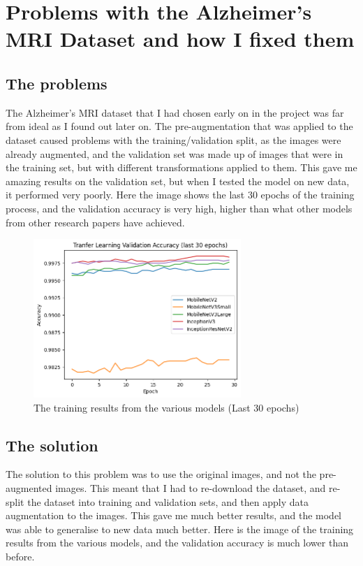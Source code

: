 \documentclass[]{final_report}
\begin{document}
\section{Problems with the Alzheimer's MRI Dataset and how I fixed them}

\subsection{The problems}
The Alzheimer's MRI dataset that I had chosen early on in the project was far from ideal as I found out later on.
The pre-augmentation that was applied to the dataset caused problems with the training/validation split, as the 
images were already augmented, and the validation set was made up of images that were in the training set, but 
with different transformations applied to them. This gave me amazing results on the validation set, but when I 
tested the model on new data, it performed very poorly. Here the image shows the last 30 epochs of the training process,
and the validation accuracy is very high, higher than what other models from other research papers have achieved.

\begin{figure}[h]
  \centering
  \includegraphics[width=0.7\textwidth]{images/bad-training-result.png}
  \caption{The training results from the various models (Last 30 epochs)}
  \label{fig:training_results}
\end{figure}

\pagebreak

\subsection{The solution}
The solution to this problem was to use the original images, and not the pre-augmented images.
This meant that I had to re-download the dataset, and re-split the dataset into training and validation sets,
and then apply data augmentation to the images. This gave me much better results, and the model was able to generalise
to new data much better. Here is the image of the training results from the various models, and the validation accuracy is much lower than before.
\end{document}
